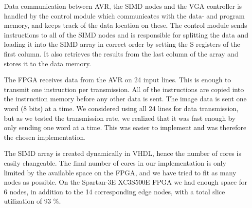 Data communication between AVR, the \ac{SIMD} nodes and the \ac{VGA}
controller is handled by the control module which communicates with the data-
and program memory, and keeps track of the data location on these. The control
module sends instructions to all of the \ac{SIMD} nodes and is responsible for
splitting the data and loading it into the \ac{SIMD} array in correct order by
setting the S registers of the first column. It also retrieves the results from
the last column of the array and stores it to the data memory.

The \ac{FPGA} receives data from the AVR on 24 input lines. This is enough to
transmit one instruction per transmission. All of the instructions are copied
into the instruction memory before any other data is sent. The image data is
sent one word (8 bits) at a time. We considered using all 24 lines for data
transmission, but as we tested the transmission rate, we realized that it was
fast enough by only sending one word at a time. This was easier to
implement and was therefore the chosen implementation.

The \ac{SIMD} array is created dynamically in \ac{VHDL}, hence the
number of cores is easily changeable. The final number of cores in our
implementation is only limited by the available space on the \ac{FPGA},
and we have tried to fit as many nodes as possible. On the Spartan-3E
XC3S500E \ac{FPGA} we had enough space for 6 nodes, in addition to the
14 corresponding edge nodes, with a total slice utilization of 93 \%.
